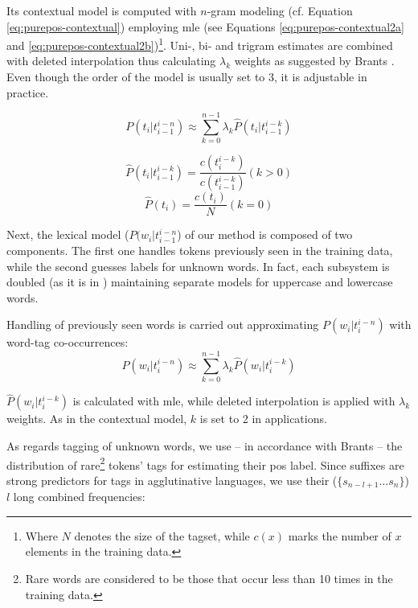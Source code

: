 Its contextual model is computed with $n$-gram modeling (cf. Equation \ref{eq:purepos-contextual}) employing \gls{mle} (see Equations \ref{eq:purepos-contextual2a} and \ref{eq:purepos-contextual2b})\footnote{Where $N$ denotes the size of the tagset, while $c(x)$ marks the number of $x$ elements in the training data.}. 
Uni-, bi- and trigram estimates are combined with deleted interpolation thus calculating $\lambda_k$ weights as suggested by Brants \cite{Brants2000}. Even though the order of the model is usually set to 3, it is adjustable in practice. 


\begin{equation}\label{eq:purepos-contextual}
P(t_i | t_{i-1}^{i-n}) \approx \sum_{k=0}^{n-1} \lambda_k \hat{P}(t_i|t_{i-1}^{i-k})
\end{equation}

\begin{equation}\label{eq:purepos-contextual2a}
\hat{P}(t_i|t_{i-1}^{i-k}) = \frac{c(t^{i-k}_i)}{c(t_{i-1}^{i-k})} (k>0) 
\end{equation}
\begin{equation}\label{eq:purepos-contextual2b}
\hat{P}(t_i) = \frac{c(t_i)}{N} (k=0)
\end{equation}

Next, the lexical model ($P(w_i|t_{i-1}^{i-n}$) of our method is composed of two components. 
The first one handles tokens previously seen in the training data, while the second guesses labels for unknown words. 
In fact, each subsystem is doubled (as it is in \cite{Brants2000,Halacsy2007}) maintaining separate models for uppercase and lowercase words. 

Handling of previously seen words is carried out approximating $P(w_i | t_{i}^{i-n})$ with word-tag co-occurrences: 
\begin{equation} \label{eq:purepos-lexical}
P(w_i | t_{i}^{i-n}) \approx  \sum_{k=0}^{n-1} \lambda_k \hat{P}(w_i|t_{i}^{i-k})
\end{equation}

\label{sec:purepos-guesser}
$\hat{P}(w_i|t_{i}^{i-k})$ is calculated with \acrlong{mle}, while deleted interpolation is applied with $\lambda_k$ weights. 
As in the contextual model, $k$ is set to 2 in applications.

As regards tagging of unknown words, we use -- in accordance with Brants -- the distribution of rare\footnote{Rare words are considered to be those that occur less than 10 times in the training data.}
tokens’ tags for estimating their \gls{pos} label. 
Since suffixes are strong predictors for tags in agglutinative languages, we use their ($\{s_{n-l+1} \dots s_n\}$) $l$ long combined frequencies:

